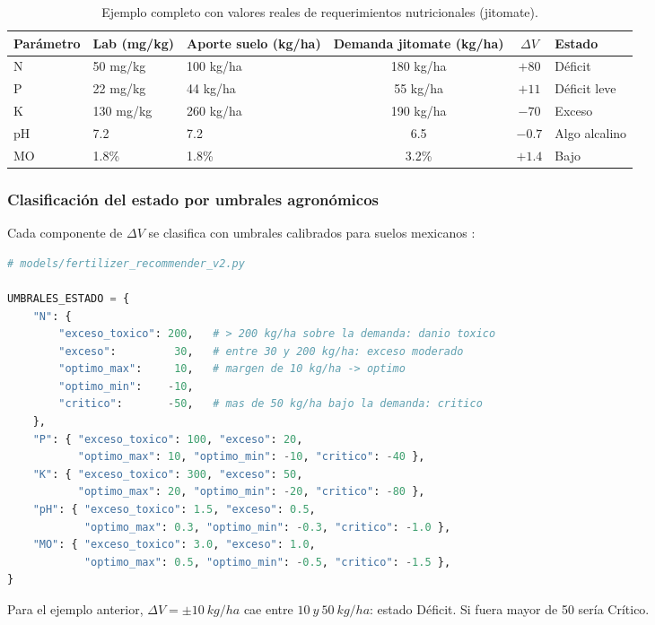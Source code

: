 \documentclass[12pt]{article}
\begin{document}
\begin{table}[htpb]
\centering
\caption{Ejemplo completo con valores reales de requerimientos nutricionales (jitomate).}
\label{tab:ejemplo_jitomate}
\begin{tabular}{lllccl}
\toprule
\textbf{Parámetro} & \textbf{Lab (mg/kg)} & \textbf{Aporte suelo (kg/ha)} & \textbf{Demanda jitomate (kg/ha)} & \textbf{$\Delta V$} & \textbf{Estado} \\
\midrule
N  & 50 mg/kg  & 100 kg/ha & 180 kg/ha & $+80$  & Déficit \\
P  & 22 mg/kg  & 44 kg/ha  & 55 kg/ha  & $+11$  & Déficit leve \\
K  & 130 mg/kg & 260 kg/ha & 190 kg/ha & $-70$  & Exceso \\
pH & 7.2       & 7.2       & 6.5       & $-0.7$ & Algo alcalino \\
MO & 1.8\%     & 1.8\%     & 3.2\%     & $+1.4$ & Bajo \\
\bottomrule
\end{tabular}
\end{table}

\subsubsection{Clasificación del estado por umbrales agronómicos}
Cada componente de $\Delta V$ se clasifica con umbrales calibrados para suelos mexicanos \citep{inifap_2019}:
\begin{lstlisting}[language=Python]
# models/fertilizer_recommender_v2.py

UMBRALES_ESTADO = {
    "N": {
        "exceso_toxico": 200,   # > 200 kg/ha sobre la demanda: danio toxico
        "exceso":         30,   # entre 30 y 200 kg/ha: exceso moderado
        "optimo_max":     10,   # margen de 10 kg/ha -> optimo
        "optimo_min":    -10,
        "critico":       -50,   # mas de 50 kg/ha bajo la demanda: critico
    },
    "P": { "exceso_toxico": 100, "exceso": 20,
           "optimo_max": 10, "optimo_min": -10, "critico": -40 },
    "K": { "exceso_toxico": 300, "exceso": 50,
           "optimo_max": 20, "optimo_min": -20, "critico": -80 },
    "pH": { "exceso_toxico": 1.5, "exceso": 0.5,
            "optimo_max": 0.3, "optimo_min": -0.3, "critico": -1.0 },
    "MO": { "exceso_toxico": 3.0, "exceso": 1.0,
            "optimo_max": 0.5, "optimo_min": -0.5, "critico": -1.5 },
}
\end{lstlisting}
Para el ejemplo anterior, $\Delta V = \pm 10\ kg/ha$ cae entre $10\ y\ 50\ kg/ha$: estado Déficit. Si fuera mayor de 50 sería Crítico.
\end{document}
